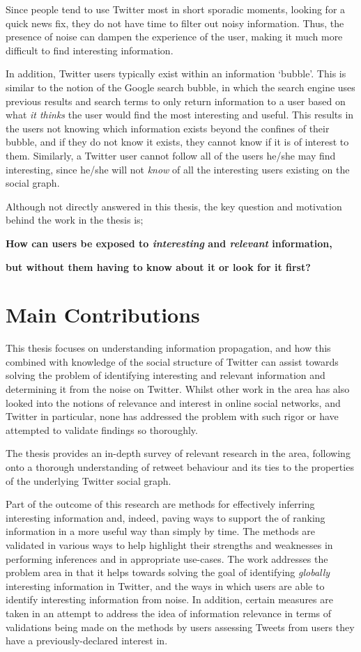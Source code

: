 Since people tend to use Twitter most in short sporadic moments, looking for a quick news fix, they do not have time to filter out noisy information. Thus, the presence of noise can dampen the experience of the user, making it much more difficult to find interesting information.

In addition, Twitter users typically exist within an information `bubble'. This is similar to the notion of the Google search bubble, in which the search engine uses previous results and search terms to only return information to a user based on what \textit{it thinks} the user would find the most interesting and useful. This results in the users not knowing which information exists beyond the confines of their bubble, and if they do not know it exists, they cannot know if it is of interest to them. Similarly, a Twitter user cannot follow all of the users he/she may find interesting, since he/she will not \textit{know} of all the interesting users existing on the social graph.

Although not directly answered in this thesis, the key question and motivation behind the work in the thesis is;\\
\centerline{\textbf{How can users be exposed to \textit{interesting} and \textit{relevant} information,}}
\centerline{\textbf{but without them having to know about it or look for it first?}}

\section{Main Contributions}
This thesis focuses on understanding information propagation, and how this combined with knowledge of the social structure of Twitter can assist towards solving the problem of identifying interesting and relevant information and determining it from the noise on Twitter. Whilst other work in the area has also looked into the notions of relevance and interest in online social networks, and Twitter in particular, none has addressed the problem with such rigor or have attempted to validate findings so thoroughly.

The thesis provides an in-depth survey of relevant research in the area, following onto a thorough understanding of retweet behaviour and its ties to the properties of the underlying Twitter social graph. 

Part of the outcome of this research are methods for effectively inferring interesting information and, indeed, paving ways to support the of ranking information in a more useful way than simply by time. The methods are validated in various ways to help highlight their strengths and weaknesses in performing inferences and in appropriate use-cases. The work addresses the problem area in that it helps towards solving the goal of identifying \textit{globally} interesting information in Twitter, and the ways in which users are able to identify interesting information from noise. In addition, certain measures are taken in an attempt to address the idea of information relevance in terms of validations being made on the methods by users assessing Tweets from users they have a previously-declared interest in.


